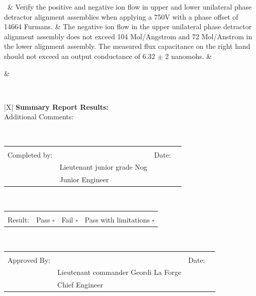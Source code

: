 \documentclass[a4paper,12pt]{article}
\theoremstyle{definition}
\newcounter{teststepctr}
\def\arraystretch{1.5}%
\begin{document}
\begin{xltabular}{\textwidth}
	\addtocounter{teststepctr}{1} \theteststepctr \ &
	Verify the positive and negative ion flow in upper and lower unilateral phase detractor alignment assemblies when applying a 750V with a phase offset of 14664 Furmans.  &
	The negative ion flow in the upper unilateral phase detractor alignment assembly does not exceed 104 Mol/Angstrom and 72 Mol/Anstrom in the lower alignment assembly.
	The measured flux capacitance on the right hand should not exceed an output conductance of 6.32 $\pm$ 2 nanomohs.
	&

	&

	\\ \hline

\end{xltabular}
\egroup


\noindent\bgroup
\def\arraystretch{1.5}%
\begin{tabularx}{\textwidth}{|X|}
	\hline
	\textbf{Summary Report Results:} \\  \hline
	Additional Comments:             \\ \rule{0pt}{12ex}     \\ \hline


	\bgroup
	\def\arraystretch{1.1}%
	\begin{tabular}{@{}p{0.98in}p{3.2in}p{0.3in}p{1.4in}@{}}
		\rule{0pt}{3ex}                                                  \\
		Completed by: & \hrulefill                  & Date: & \hrulefill \\
		              & Lieutenant junior grade Nog &       &            \\
		              & Junior Engineer             &       &            \\
	\end{tabular}
	\egroup
	\\ \hline


	\bgroup
	\def\arraystretch{1.1}%
	\begin{tabular}{@{}p{0.98in}p{1.45in}p{1.45in}p{1.6in}@{}}
		\rule{0pt}{.5ex}                                 \\ Result: &
		Pass $\square$ &
		Fail $\square$ &
		Pass with limitations $\square$ \rule{0pt}{.5ex} \\
	\end{tabular}
	\egroup
	\\ \hline



	\bgroup
	\def\arraystretch{1.1}%
	\begin{tabular}{@{}p{0.98in}p{3.2in}p{0.3in}p{1.4in}@{}}
		\rule{0pt}{3ex}                                                          \\
		Approved By: & \hrulefill                           & Date: & \hrulefill \\
		             & Lieutenant commander Geordi La Forge &       &            \\
		             & Chief Engineer                       &       &            \\
	\end{tabular}
	\egroup
	\\ \hline
\end{tabularx}
\egroup
\end{document}
